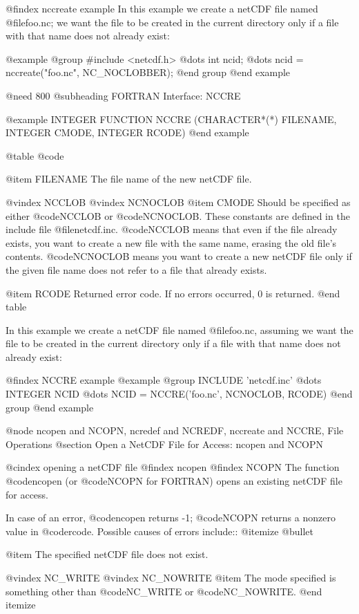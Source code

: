 @findex nccreate example
In this example we create a netCDF file named
@file{foo.nc}; we want the file to be created in the current
directory only if a file with that name does not already exist:

@example
@group
#include <netcdf.h>
   @dots{}
int ncid;
   @dots{}
ncid = nccreate("foo.nc", NC_NOCLOBBER);
@end group
@end example

@need 800
@subheading FORTRAN Interface:  NCCRE

@example
INTEGER FUNCTION NCCRE (CHARACTER*(*) FILENAME, INTEGER CMODE,
                        INTEGER RCODE)
@end example

@table @code

@item FILENAME
The file name of the new netCDF file.

@vindex NCCLOB
@vindex NCNOCLOB
@item CMODE
Should be specified as either @code{NCCLOB} or @code{NCNOCLOB}.  These
constants are defined in the include file @file{netcdf.inc}.
@code{NCCLOB} means that even if the file already exists, you want to
create a new file with the same name, erasing the old file's contents.
@code{NCNOCLOB} means you want to create a new netCDF file only if the
given file name does not refer to a file that already exists.

@item RCODE
Returned error code.  If no errors occurred, 0 is returned.
@end table

In this example we create a netCDF file named
@file{foo.nc}, assuming we want the file to be created in the current
directory only if a file with that name does not already exist:

@findex NCCRE example
@example
@group
      INCLUDE 'netcdf.inc'
         @dots{}
      INTEGER NCID
         @dots{}
      NCID = NCCRE('foo.nc', NCNOCLOB, RCODE)
@end group
@end example

@node ncopen and NCOPN, ncredef and NCREDF, nccreate and NCCRE, File Operations
@section Open a NetCDF File for Access:  ncopen and NCOPN

@cindex opening a netCDF file
@findex ncopen
@findex NCOPN
The function @code{ncopen} (or @code{NCOPN} for FORTRAN)
opens an existing netCDF file for access.

In case of an error, @code{ncopen} returns -1; @code{NCOPN} returns a
nonzero value in @code{rcode}.  Possible causes of errors include::
@itemize @bullet

@item
The specified netCDF file does not exist.

@vindex NC_WRITE
@vindex NC_NOWRITE
@item
The mode specified is something other than @code{NC_WRITE} or
@code{NC_NOWRITE}.
@end itemize

